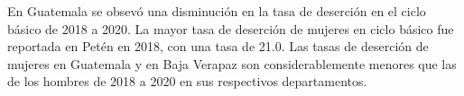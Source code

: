 En Guatemala se obsevó una disminución en la tasa de deserción en el ciclo básico de 2018 a 2020. La mayor tasa de deserción de mujeres en ciclo básico fue reportada en Petén en 2018, con una tasa de 21.0. Las tasas de deserción de mujeres en Guatemala y en Baja Verapaz son considerablemente menores que las de los hombres de 2018 a 2020 en sus respectivos departamentos. 